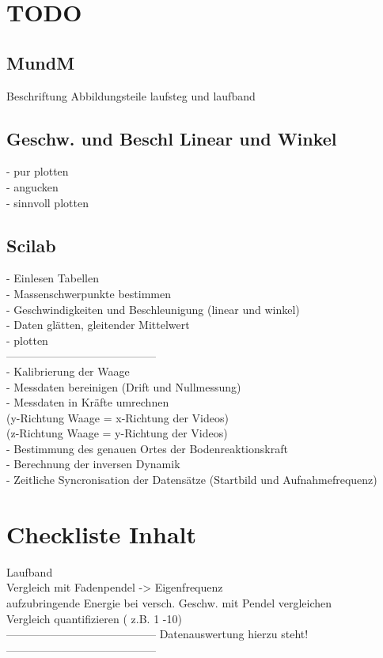 \section{TODO}
\subsection{MundM}
Beschriftung Abbildungsteile laufsteg und laufband
\subsection{Geschw. und Beschl Linear und Winkel}
- pur plotten\\
- angucken\\
- sinnvoll plotten\\
\subsection{Scilab}
- Einlesen Tabellen\\
- Massenschwerpunkte bestimmen\\
- Geschwindigkeiten und Beschleunigung (linear und winkel)\\
- Daten glätten, gleitender Mittelwert\\
- plotten\\
-----------------------------------------\\
- Kalibrierung der Waage\\
- Messdaten bereinigen (Drift und Nullmessung)\\
- Messdaten in Kräfte umrechnen\\
(y-Richtung Waage = x-Richtung der Videos)\\
(z-Richtung Waage = y-Richtung der Videos)\\
- Bestimmung des genauen Ortes der Bodenreaktionskraft\\
- Berechnung der inversen Dynamik\\
- Zeitliche Syncronisation der Datensätze (Startbild und Aufnahmefrequenz)\\
\clearpage

\section{Checkliste Inhalt}
Laufband\\
Vergleich mit Fadenpendel -> Eigenfrequenz\\
aufzubringende Energie bei versch. Geschw. mit Pendel vergleichen\\
Vergleich quantifizieren ( z.B. 1 -10)\\
-----------------------------------------
Datenauswertung hierzu steht!
-----------------------------------------\\\\

